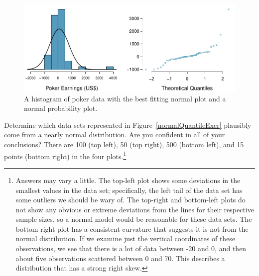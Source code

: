 \begin{figure}
\centering
\includegraphics[width=\textwidth]{02/figures/pokerNormal/pokerNormal}
\caption{A histogram of poker data with the best fitting normal plot and a normal probability plot.}
\label{pokerNormal}
\end{figure}

\begin{exercise}\label{normalQuantileExercise}
Determine which data sets represented in Figure~\ref{normalQuantileExer} plausibly come from a nearly normal distribution. Are you confident in all of your conclusions? There are 100 (top left), 50 (top right), 500 (bottom left), and 15 points (bottom right) in the four plots.\footnote{Answers may vary a little. The top-left plot shows some deviations in the smallest values in the data set; specifically, the left tail of the data set has some outliers we should be wary of. The top-right and bottom-left plots do not show any obvious or extreme deviations from the lines for their respective sample sizes, so a normal model would be reasonable for these data sets. The bottom-right plot has a consistent curvature that suggests it is not from the normal distribution. If we examine just the vertical coordinates of these observations, we see that there is a lot of data between -20 and 0, and then about five observations scattered between 0 and 70. This describes a distribution that has a strong right skew.}
\end{exercise}

